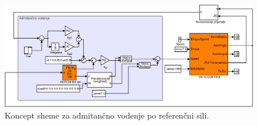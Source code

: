\begin{figure}[!h]
	\centering
	\includegraphics[trim={0 0cm 0 0cm},scale=0.5]{./Slike/admitance_control.eps}
	\caption{Koncept \simulink sheme za admitan\v{c}no vodenje po referen\v{c}ni sili.}
	\label{fig:admitance_control}
\end{figure}
